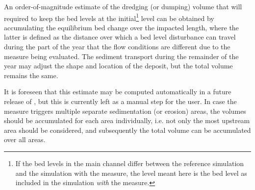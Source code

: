 An order-of-magnitude estimate of the dredging (or dumping) volume that will required to keep the bed levels at the initial\footnote{If the bed levels in the main channel differ between the reference simulation and the simulation with the measure, the level meant here is the bed level as included in the simulation \emph{with} the measure.} level can be obtained by accumulating the equilibrium bed change over the impacted length, where the latter is defined as the distance over which a bed level disturbance can travel during the part of the year that the flow conditions are different due to the measure being evaluated.
The sediment transport during the remainder of the year may adjust the shape and location of the deposit, but the total volume remains the same.

It is foreseen that this estimate may be computed automatically in a future release of \dfmi, but this is currently left as a manual step for the user.
In case the measure triggers multiple separate sedimentation (or erosion) areas, the volumes should be accumulated for each area individually, i.e. not only the most upstream area should be considered, and subsequently the total volume can be accumulated over all areas.
